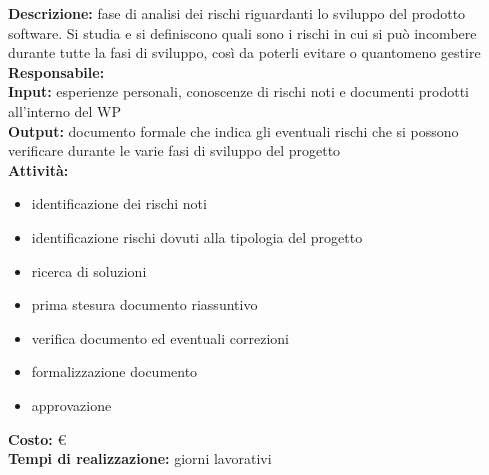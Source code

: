 \textbf{Descrizione:} fase di analisi dei rischi riguardanti lo sviluppo del prodotto software. Si
studia e si definiscono quali sono i rischi in cui si può incombere durante tutte la fasi di
sviluppo, così da poterli evitare o quantomeno gestire\\
\linebreak
\textbf{Responsabile:} \\
\linebreak
\textbf{Input:} esperienze personali, conoscenze di rischi noti e documenti prodotti all’interno
del WP\\
\linebreak
\textbf{Output:} documento formale che indica gli eventuali rischi che si possono verificare
durante le varie fasi di sviluppo del progetto\\
\linebreak
\textbf{Attività:}
\begin{itemize}
\item identificazione dei rischi noti
\item identificazione rischi dovuti alla tipologia del progetto
\item ricerca di soluzioni
\item prima stesura documento riassuntivo
\item verifica documento ed eventuali correzioni
\item formalizzazione documento
\item approvazione
\end{itemize}
\textbf{Costo:} \euro \\
\textbf{Tempi di realizzazione:}  giorni lavorativi

